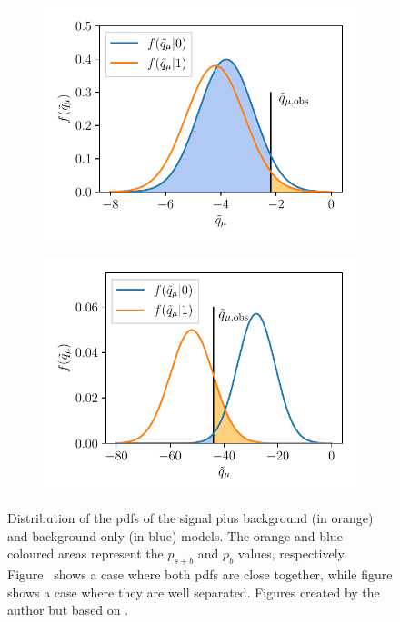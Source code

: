 \begin{figure}
	\centering
	\begin{subfigure}[b]{0.45\linewidth}
		\centering\includegraphics[width=\textwidth]{cls_1}
		\caption{\label{fig:cls_close}}
	\end{subfigure}%
	\begin{subfigure}[b]{0.45\linewidth}
		\centering\includegraphics[width=\textwidth]{cls_2}
		\caption{\label{fig:cls_far}}
	\end{subfigure}%
	\caption{Distribution of the \glspl{pdf} of the signal plus background (in orange) and background-only (in blue) models. The orange and blue coloured areas represent the $p_{s+b}$ and $p_{b}$ values, respectively. Figure~ shows a case where both \glspl{pdf} are close together, while figure  shows a case where they are well separated. Figures created by the author but based on \cite{Cowan:2013pha}.}\label{fig:cls_method}
\end{figure}

